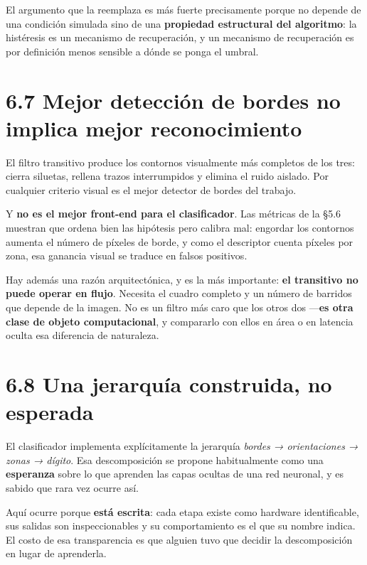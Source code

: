 El argumento que la reemplaza es más fuerte precisamente porque no
depende de una condición simulada sino de una \textbf{propiedad
estructural del algoritmo}: la histéresis es un mecanismo de
recuperación, y un mecanismo de recuperación es por definición menos
sensible a dónde se ponga el umbral.

\section{6.7 Mejor detección de bordes no implica mejor
reconocimiento}\label{mejor-detecciuxf3n-de-bordes-no-implica-mejor-reconocimiento}

El filtro transitivo produce los contornos visualmente más completos de
los tres: cierra siluetas, rellena trazos interrumpidos y elimina el
ruido aislado. Por cualquier criterio visual es el mejor detector de
bordes del trabajo.

Y \textbf{no es el mejor front-end para el clasificador}. Las métricas
de la §5.6 muestran que ordena bien las hipótesis pero calibra mal:
engordar los contornos aumenta el número de píxeles de borde, y como el
descriptor cuenta píxeles por zona, esa ganancia visual se traduce en
falsos positivos.

Hay además una razón arquitectónica, y es la más importante: \textbf{el
transitivo no puede operar en flujo}. Necesita el cuadro completo y un
número de barridos que depende de la imagen. No es un filtro más caro
que los otros dos ---\textbf{es otra clase de objeto computacional}, y
compararlo con ellos en área o en latencia oculta esa diferencia de
naturaleza.

\section{6.8 Una jerarquía construida, no
esperada}\label{una-jerarquuxeda-construida-no-esperada}

El clasificador implementa explícitamente la jerarquía \emph{bordes →
orientaciones → zonas → dígito}. Esa descomposición se propone
habitualmente como una \textbf{esperanza} sobre lo que aprenden las
capas ocultas de una red neuronal, y es sabido que rara vez ocurre así.

Aquí ocurre porque \textbf{está escrita}: cada etapa existe como
hardware identificable, sus salidas son inspeccionables y su
comportamiento es el que su nombre indica. El costo de esa transparencia
es que alguien tuvo que decidir la descomposición en lugar de
aprenderla.

